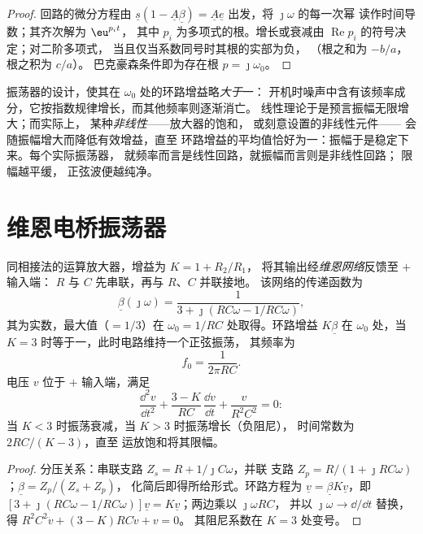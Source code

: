 \begin{proof}
回路的微分方程由 $\underline s(1 -
\underline A\underline\beta) = \underline A\underline e$ 出发，将 $\jmath\omega$ 的每一次幂
读作时间导数；其齐次解为 $\eu^{p_it}$，
其中 $p_i$ 为多项式的根。增长或衰减由
$\operatorname{Re}p_i$ 的符号决定；对二阶多项式，
当且仅当系数同号时其根的实部为负，
（根之和为 $-b/a$，根之积为 $c/a$）。
巴克豪森条件即为存在根 $p = \jmath\omega_0$。
\end{proof}

\begin{remark}[振荡器的起振与停振]\label{rem:b2:feedback-oscillators:start}
振荡器的设计，使其在 $\omega_0$ 处的环路增益略\emph{大于}一：
开机时噪声中含有该频率成分，它按指数规律增长，而其他频率则逐渐消亡。
线性理论于是预言振幅无限增大；而实际上，
某种\emph{非线性}——放大器的饱和，
或刻意设置的非线性元件——
会随振幅增大而降低有效增益，直至
环路增益的平均值恰好为一：振幅于是稳定下来。每个实际振荡器，
就频率而言是线性回路，就振幅而言则是非线性回路；
限幅越平缓，
正弦波便越纯净。
\end{remark}

\section{维恩电桥振荡器}

\begin{proposition}[维恩电桥振荡器]\label{prop:b2:feedback-oscillators:wien}
同相接法的运算放大器，增益为 $K = 1 + R_2/R_1$，
将其输出经\emph{维恩网络}反馈至 $+$ 输入端：
$R$ 与 $C$ 先串联，再与 $R$、$C$ 并联接地。
该网络的传递函数为
\[
\underline\beta(\jmath\omega) = \frac1{3 + \jmath(RC\omega - 1/RC\omega)} ,
\]
其为实数，最大值（$= 1/3$）在 $\omega_0 = 1/RC$ 处取得。环路增益 $K\underline\beta$
在 $\omega_0$ 处，当 $K = 3$ 时等于一，此时电路维持一个正弦振荡，
其频率为
\[
f_0 = \frac1{2\pi RC} .
\]
电压 $v$ 位于 $+$ 输入端，满足
\[
\frac{\dd^2v}{\dd t^2} + \frac{3 - K}{RC}\,\frac{\dd v}{\dd t} + \frac{v}{R^2C^2} = 0 :
\]
当 $K < 3$ 时振荡衰减，当 $K > 3$ 时振荡增长（负阻尼），
时间常数为 $2RC/(K - 3)$，直至
运放饱和将其限幅。
\end{proposition}

\begin{proof}
分压关系：串联支路 $Z_s = R + 1/\jmath C\omega$，并联
支路 $Z_p = R/(1 + \jmath RC\omega)$；$\underline\beta = Z_p/(Z_s + Z_p)$，
化简后即得所给形式。环路方程为 $\underline v = \underline\beta K\underline v$，即
$[3 + \jmath(RC\omega - 1/RC\omega)]\underline v = K\underline v$；两边乘以 $\jmath\omega RC$，
并以 $\jmath\omega \to \dd/\dd t$ 替换，得 $R^2C^2\ddot v + (3 - K)RC\dot v + v = 0$。
其阻尼系数在 $K = 3$ 处变号。
\end{proof}

